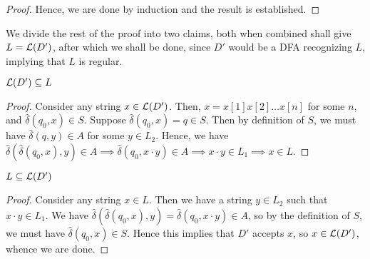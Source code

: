 \begin{soln}
\begin{proof}
            Hence, we are done by induction and the result is established.
        \end{proof}

        We divide the rest of the proof into two claims, both when combined shall give $L = \mathcal{L}(D')$, after which we shall be done, since $D'$ would be a DFA recognizing $L$, implying that $L$ is regular.\\

        \begin{claim}
            $\mathcal{L}(D') \subseteq L$
        \end{claim}

        \begin{proof}
            Consider any string $x \in \mathcal{L}(D')$. Then, $x = x[1] x[2] \ldots x[n]$ for some $n$, and $\hat{\delta}(q_0, x) \in S$. Suppose $\hat{\delta}(q_0, x) = q \in S$. Then by definition of $S$,
            we must have $\hat{\delta}(q, y) \in A$ for some $y \in L_2$. Hence, we have $\hat{\delta}(\hat{\delta}(q_0, x), y) \in A \implies \hat{\delta}(q_0, x \cdot y) \in A \implies
            x \cdot y \in L_1 \implies x \in L$.
        \end{proof}

        \begin{claim}
            $L \subseteq \mathcal{L}(D')$
        \end{claim}
        \begin{proof}
            Consider any string $x \in L$. Then we have a string $y \in L_2$ such that $x \cdot y \in L_1$. We have $\hat{\delta}(\hat{\delta}(q_0, x), y) = \hat{\delta}(q_0, x \cdot y) \in A$, so
            by the definition of $S$, we must have $\hat{\delta}(q_0, x) \in S$. Hence this implies that $D'$ accepts $x$, so $x \in \mathcal{L}(D')$, whence we are done.
        \end{proof}


\end{soln}

